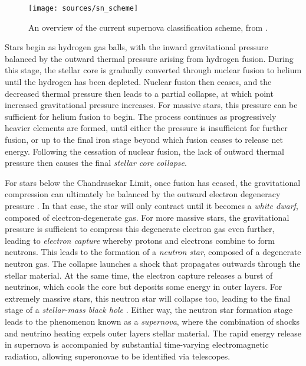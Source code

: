 \begin{figure}[!ht]
	\texttt{[image: sources/sn\_scheme]}
	\caption{An overview of the current supernova classification scheme, from \cite{sn_classification}.}
	\label{fig:snzoo}
\end{figure}

Stars begin as hydrogen gas balls, with the inward gravitational pressure balanced by the outward thermal pressure arising from hydrogen fusion. During this stage, the stellar core is gradually converted through nuclear fusion to helium until the hydrogen has been depleted. Nuclear fusion then ceases, and the decreased thermal pressure then leads to a partial collapse, at which point increased gravitational pressure increases. For massive stars, this pressure can be sufficient for helium fusion to begin. The process continues as progressively heavier elements are formed, until either the pressure is insufficient for further fusion, or up to the final iron stage beyond which fusion ceases to release net energy. Following the cessation of nuclear fusion, the lack of outward thermal pressure then causes the final \emph{stellar core collapse}.

For stars below the Chandrasekar Limit, once fusion has ceased, the gravitational compression can ultimately be balanced by the outward electron degeneracy pressure . In that case, the star will only contract until it becomes a \emph{white dwarf}, composed of electron-degenerate gas. For more massive stars, the gravitational pressure is sufficient to compress this degenerate electron gas even further, leading to \emph{electron capture} whereby protons and electrons combine to form neutrons. This leads to the formation of a \emph{neutron star}, composed of a degenerate neutron gas. The collapse launches a shock that propagates outwards through the stellar material. At the same time, the electron capture releases a burst of neutrinos, which cools the core but deposits some energy in outer layers. For extremely massive stars, this neutron star will collapse too, leading to the final stage of a \emph{stellar-mass black hole} . Either way, the neutron star formation stage leads to the phenomenon known as a \emph{supernova}, where the combination of shocks and neutrino heating expels outer layers stellar material. The rapid energy release in supernova is accompanied by substantial time-varying electromagnetic radiation, allowing superonovae to be identified via telescopes.

